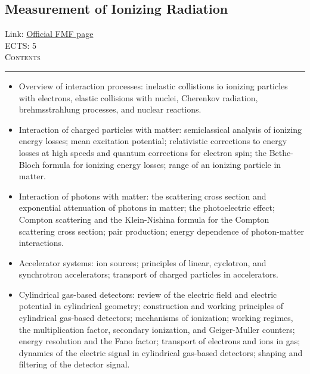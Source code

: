 \documentclass[11pt, a4paper]{article}
\newenvironment{course}[3]{
\subsection{#1}%
Link: \href{#2}{Official FMF page}\\%
ECTS: #3%
\vspace{1ex}
\\
{\large \textsc{Contents}}\\[-0.9ex]%
\rule{\textwidth}{0.5pt}
\vspace{-3ex}
}
{}
\newenvironment{chapter}[1]{
\begin{tcolorbox}[title=#1, breakable]
}
{\end{tcolorbox}}
\begin{document}
\begin{course}{Measurement of Ionizing Radiation}{https://www.fmf.uni-lj.si/en/study-physics/programmes/1fiz/2020/7000777/courses/1446/}{5}
    \label{measurement-of-ionizing-radiation}

    \begin{chapter}{Interaction of radiation with matter}
        \begin{itemize}
        
            \item Overview of interaction processes: inelastic collistions io ionizing particles with electrons, elastic collisions with nuclei, Cherenkov radiation, brehmsstrahlung processes, and nuclear reactions.

            \item Interaction of charged particles with matter: semiclassical analysis of ionizing energy losses; mean excitation potential; relativistic corrections to energy losses at high speeds and quantum corrections for electron spin; the Bethe-Bloch formula for ionizing energy losses; range of an ionizing particle in matter.

            \item Interaction of photons with matter: the scattering cross section and exponential attenuation of photons in matter; the photoelectric effect; Compton scattering and the Klein-Nishina formula for the Compton scattering cross section; pair production; energy dependence of photon-matter interactions.
        
        \end{itemize}
    \end{chapter}

    \begin{chapter}{Particle detectors}
        \begin{itemize}
            
            \item Accelerator systems: ion sources; principles of linear, cyclotron, and synchrotron accelerators; transport of charged particles in accelerators.

            \item Cylindrical gas-based detectors: review of the electric field and electric potential in cylindrical geometry; construction and working principles of cylindrical gas-based detectors; mechanisms of ionization; working regimes, the multiplication factor, secondary ionization, and Geiger-Muller counters; energy resolution and the Fano factor; transport of electrons and ions in gas; dynamics of the electric signal in cylindrical gas-based detectors; shaping and filtering of the detector signal.


\end{itemize}
\end{chapter}
\end{course}
\end{document}
